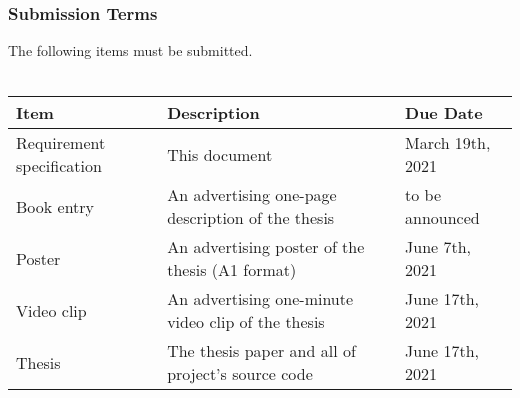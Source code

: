 \subsubsection{Submission Terms}
The following items must be submitted.
\\\\
\noindent
\begin{tabular}{|l|l|l|}
    \hline
    \textbf{Item}               & \textbf{Description}                               & \textbf{Due Date}     \\ \hline
    Requirement specification   & This document                                      & March 19th, 2021      \\ \hline
    Book entry                  & An advertising one-page description of the thesis  & to be announced       \\ \hline
    Poster                      & An advertising poster of the thesis (A1 format)    & June 7th, 2021        \\ \hline
    Video clip                  & An advertising one-minute video clip of the thesis & June 17th, 2021       \\ \hline
    Thesis                      & The thesis paper and all of project's source code  & June 17th, 2021       \\ \hline
\end{tabular}
\newline
\noindent